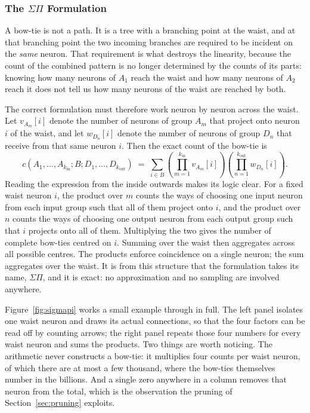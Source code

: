\documentclass[12pt,a4paper,oneside]{article}
\theoremstyle{definition}
\theoremstyle{plain}
\newcommand{\kin}{k_{\mathrm{in}}}
\newcommand{\kout}{k_{\mathrm{out}}}
\newcommand{\sigmapi}{\ensuremath{\Sigma\Pi}}
\begin{document}
\subsubsection{The \sigmapi{} Formulation}
\label{sec:sigmapi}

A bow-tie is not a path. It is a tree with a branching point at the waist,
and at that branching point the two incoming branches are required to be
incident on the \emph{same} neuron. That requirement is what destroys the
linearity, because the count of the combined pattern is no longer determined
by the counts of its parts: knowing how many neurons of $A_1$ reach the
waist and how many neurons of $A_2$ reach it does not tell us how many
neurons of the waist are reached by both.

The correct formulation must therefore work neuron by neuron across the
waist. Let $v_{A_m}[i]$ denote the number of neurons of group $A_m$ that
project onto neuron $i$ of the waist, and let $w_{D_n}[i]$ denote the number
of neurons of group $D_n$ that receive from that same neuron $i$. Then the
exact count of the bow-tie is
\begin{equation}
  \label{eq:sigmapi}
  c(A_1,\dots,A_{\kin};B;D_1,\dots,D_{\kout})
  \;=\;
  \sum_{i \in B}
  \left( \prod_{m=1}^{\kin} v_{A_m}[i] \right)
  \left( \prod_{n=1}^{\kout} w_{D_n}[i] \right).
\end{equation}
Reading the expression from the inside outwards makes its logic clear. For a
fixed waist neuron $i$, the product over $m$ counts the ways of choosing one
input neuron from each input group such that all of them project onto $i$,
and the product over $n$ counts the ways of choosing one output neuron from
each output group such that $i$ projects onto all of them. Multiplying the
two gives the number of complete bow-ties centred on $i$. Summing over the
waist then aggregates across all possible centres. The products enforce
coincidence on a single neuron; the sum aggregates over the waist. It is
from this structure that the formulation takes its name, \sigmapi{}, and it
is exact: no approximation and no sampling are involved anywhere.

Figure~\ref{fig:sigmapi} works a small example through in full. The left
panel isolates one waist neuron and draws its actual connections, so that
the four factors can be read off by counting arrows; the right panel repeats
those four numbers for every waist neuron and sums the products. Two things
are worth noticing. The arithmetic never constructs a bow-tie: it multiplies
four counts per waist neuron, of which there are at most a few thousand,
where the bow-ties themselves number in the billions. And a single zero
anywhere in a column removes that neuron from the total, which is the
observation the pruning of Section~\ref{sec:pruning} exploits.
\end{document}
